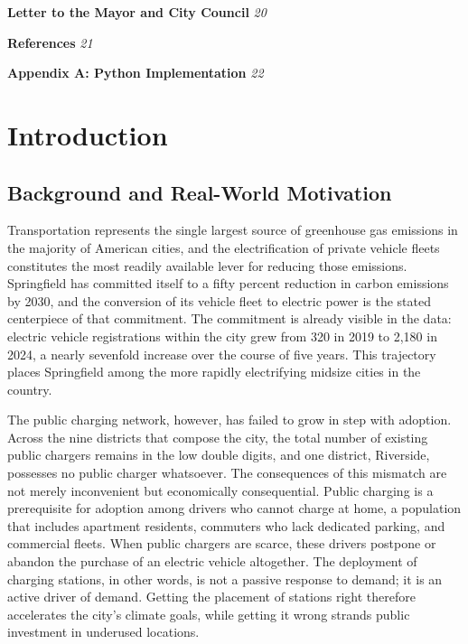 \documentclass[11pt]{article}
\begin{document}
\vspace{0.2em}
\noindent\textbf{Letter to the Mayor and City Council} \dotfill \textit{20}

\vspace{0.2em}
\noindent\textbf{References} \dotfill \textit{21}

\vspace{0.2em}
\noindent\textbf{Appendix A: Python Implementation} \dotfill \textit{22}

\newpage

\section{Introduction}

\subsection{Background and Real-World Motivation}

Transportation represents the single largest source of greenhouse gas emissions in the majority of American cities, and the electrification of private vehicle fleets constitutes the most readily available lever for reducing those emissions. Springfield has committed itself to a fifty percent reduction in carbon emissions by 2030, and the conversion of its vehicle fleet to electric power is the stated centerpiece of that commitment. The commitment is already visible in the data: electric vehicle registrations within the city grew from 320 in 2019 to 2{,}180 in 2024, a nearly sevenfold increase over the course of five years. This trajectory places Springfield among the more rapidly electrifying midsize cities in the country.

The public charging network, however, has failed to grow in step with adoption. Across the nine districts that compose the city, the total number of existing public chargers remains in the low double digits, and one district, Riverside, possesses no public charger whatsoever. The consequences of this mismatch are not merely inconvenient but economically consequential. Public charging is a prerequisite for adoption among drivers who cannot charge at home, a population that includes apartment residents, commuters who lack dedicated parking, and commercial fleets. When public chargers are scarce, these drivers postpone or abandon the purchase of an electric vehicle altogether. The deployment of charging stations, in other words, is not a passive response to demand; it is an active driver of demand. Getting the placement of stations right therefore accelerates the city's climate goals, while getting it wrong strands public investment in underused locations.
\end{document}
